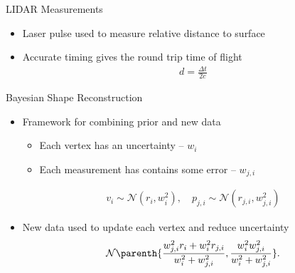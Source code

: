 \documentclass[11pt,professionalfonts]{beamer}
\begin{document}
\begin{frame}{LIDAR Measurements }
    \begin{itemize}
        \item<1-> Laser pulse used to measure relative distance to surface
        \item<2-> Accurate timing gives the round trip time of flight
            \begin{align*}
                d = \frac{\Delta t}{2 c}
            \end{align*}
    \end{itemize}
    
\end{frame}

\begin{frame}{Bayesian Shape Reconstruction}
    \begin{itemize}
        \item<1-> Framework for combining prior and new data 
            \begin{itemize}
                \item Each vertex has an uncertainty -- \( w_i\)
                \item Each measurement has contains some error -- \( w_{j, i} \)
            \end{itemize}
            \begin{align*}
                v_i \sim \mathcal{N}(r_i, w_i^2) , \quad
                p_{j,i} \sim \mathcal{N}(r_{j,i}, w_{j,i}^2)
            \end{align*}
        \item<2-> New data used to update each vertex and reduce uncertainty
    \begin{align*}\label{eq:posterior_probability}
        \mathcal{N} \parenth{\frac{w_{j, i}^2 r_i + w_i^2 r_{j, i}}{w_i^2 + w_{j, i}^2} , \frac{w_i^2  w_{j, i}^2}{w_i^2 +  w_{j, i}^2}} .
    \end{align*}
    \end{itemize}
\end{frame}
\end{document}
